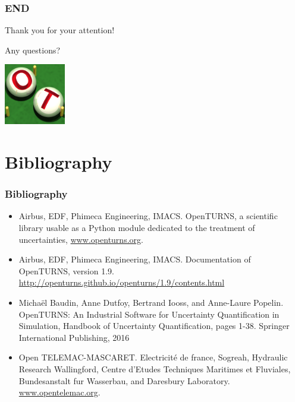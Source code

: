\documentclass{beamer}
\begin{document}

\begin{frame}
\frametitle{END}

Thank you for your attention!

Any questions?

\begin{center}
\includegraphics[width=0.2\textwidth]{figures/logo-ot-small}
\end{center}

\end{frame}


\section{Bibliography}

\begin{frame}
\frametitle{Bibliography}

\begin{itemize}
\item Airbus, EDF, Phimeca Engineering, IMACS. 
OpenTURNS, a scientific library usable as a Python module dedicated to the treatment of uncertainties, 
\url{www.openturns.org}.
\item Airbus, EDF, Phimeca Engineering, IMACS. Documentation of OpenTURNS, version 1.9. 
\url{http://openturns.github.io/openturns/1.9/contents.html}
\item  Michaël Baudin, Anne Dutfoy, Bertrand Iooss, and Anne-Laure Popelin. 
OpenTURNS: An Industrial Software for Uncertainty Quantification in Simulation, 
Handbook of Uncertainty Quantification, 
pages 1-38. Springer International Publishing, 2016
\item Open TELEMAC-MASCARET. 
Electricité de france, Sogreah, Hydraulic Research Wallingford, 
Centre d'Etudes Techniques Maritimes et Fluviales, Bundesanstalt fur Wasserbau, and Daresbury Laboratory.
\url{www.opentelemac.org}.
\end{itemize}

\end{frame}
\end{document}
